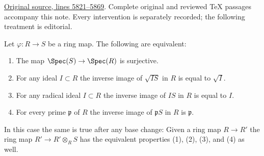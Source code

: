 \hypertarget{algebra-context-041}{}

\noindent\href{https://github.com/stacks/stacks-project/blob/a04446e57ec1fbc252a871afcec7752fb2807b14/algebra.tex\#L5821}{Original source, lines 5821--5869}. Complete original and reviewed TeX passages accompany this note. Every intervention is separately recorded; the following treatment is editorial.


\begin{lemma}
\label{editorial-source-lemma-surjective-spec-radical-ideal}
Let $\varphi : R \to S$ be a ring map.
The following are equivalent:
\begin{enumerate}
\item The map $\Spec(S) \to \Spec(R)$ is surjective.
\item For any ideal $I \subset R$
the inverse image of $\sqrt{IS}$ in $R$ is equal to $\sqrt{I}$.
\item For any radical ideal $I \subset R$ the inverse image
of $IS$ in $R$ is equal to $I$.
\item For every prime $\mathfrak p$ of $R$ the inverse
image of $\mathfrak p S$ in $R$ is $\mathfrak p$.
\end{enumerate}
In this case the same is true after any base change: Given a ring map
$R \to R'$ the ring map $R' \to R' \otimes_R S$ has the equivalent
properties (1), (2), (3), and (4) as well.
\end{lemma}

